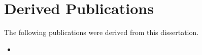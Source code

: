 \chapter{Derived Publications}
\label{app:derived_publications}

The following publications were derived from this dissertation.





\begin{itemize}
      \item \begingroup
            \endgroup
\end{itemize}

